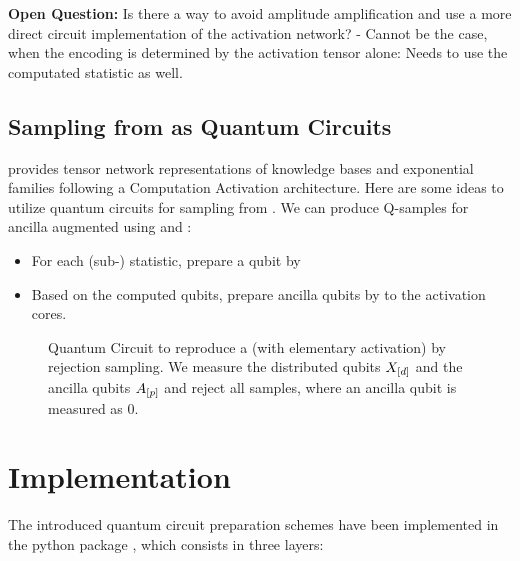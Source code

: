 \textbf{Open Question:} Is there a way to avoid amplitude amplification and use a more direct circuit implementation of the activation network?
- Cannot be the case, when the encoding is determined by the activation tensor alone: Needs to use the computated statistic as well.

\subsection{Sampling from \ComputationActivationNetworks{} as Quantum Circuits}


\tnreason{} provides tensor network representations of knowledge bases and exponential families following a Computation Activation architecture.
Here are some ideas to utilize quantum circuits for sampling from \ComputationActivationNetworks{}.
We can produce Q-samples for ancilla augmented \ComputationActivationNetworks{}  using \computationCircuits{} and \activationCircuits{}:
\begin{itemize}
    \item For each (sub-) statistic, prepare a qubit by \ComputationCircuits{}
    \item Based on the computed qubits, prepare ancilla qubits by \ActivationCircuits{} to the activation cores.
\end{itemize}

\begin{figure}
    \begin{center}
        
    \end{center}
    \caption{
        Quantum Circuit to reproduce a \ComputationActivationNetwork{} (with elementary activation) by rejection sampling.
        We measure the distributed qubits $X_{[d]}$ and the ancilla qubits $A_{[p]}$ and reject all samples, where an ancilla qubit is measured as $0$.
    }\label{fig:caCircuit}
\end{figure}


\section{Implementation}

The introduced quantum circuit preparation schemes have been implemented in the python package \qcreason{}, which consists in three layers:
\begin{center}
    
\end{center}